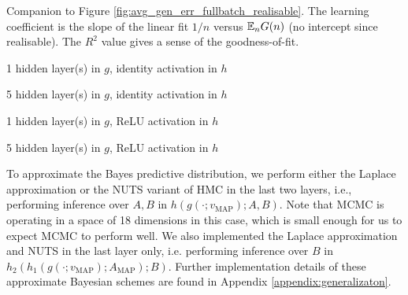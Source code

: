 \documentclass{article} %
\begin{document}
\begin{table}[h!]%
	\caption{Companion to Figure \ref{fig:avg_gen_err_fullbatch_realisable}. The learning coefficient is the slope of the linear fit $1/n$ versus $\mathbb{E}_n G(n)$ (no intercept since realisable). The $R^2$ value gives a sense of the goodness-of-fit.}
	\label{table:avg_gen_err_fullbatch_realisable}
	\centering
	\begin{tiny}
		\begin{subtable}[t]{2.5in}
			\caption{1 hidden layer(s) in $g$, identity activation in $h$}			
		\end{subtable}
		\quad
		\begin{subtable}[t]{2.5in}
			\caption{5 hidden layer(s) in $g$, identity activation in $h$}
			
		\end{subtable}
		\quad
		\begin{subtable}[t]{2.5in}
			\caption{1 hidden layer(s) in $g$, ReLU activation in $h$}
			
		\end{subtable}
		\quad
		\begin{subtable}[t]{2.5in}
			\caption{5 hidden layer(s) in $g$, ReLU activation in $h$}			
		\end{subtable}
	\end{tiny}
\end{table}

To approximate the Bayes predictive distribution, we perform either the Laplace approximation or the NUTS variant of HMC \citep{hoffman2014no} in the last two layers, i.e., performing inference over $A,B$ in
$h(g(\cdot;v_{\operatorname{MAP}});A,B).$
Note that MCMC is operating in a space of 18 dimensions in this case, which is small enough for us to expect MCMC to perform well.
We also implemented the Laplace approximation and NUTS in the last layer only, i.e. performing inference over $B$ in
$h_2(h_1(g(\cdot;v_{\operatorname{MAP}});A_{\operatorname{MAP}}); B).$
Further implementation details of these approximate Bayesian schemes are found in Appendix \ref{appendix:generalizaton}.
\end{document}
